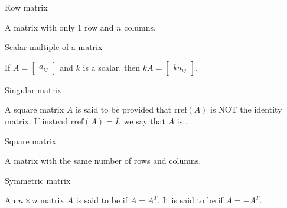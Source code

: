 \documentclass{ximera}
\begin{document}
Row matrix
\begin{expandable}
    A matrix with only $1$ row and $n$ columns.
\end{expandable}


Scalar multiple of a matrix
\begin{expandable}
    If $A=\begin{bmatrix} a_{ij}\end{bmatrix} $ and $k$ is a scalar,
then $kA=\begin{bmatrix} ka_{ij}\end{bmatrix}$. 
\end{expandable}



Singular matrix
\begin{expandable}
    A square matrix $A$ is said to be  provided that $\mbox{rref}(A)$ is NOT the identity matrix.  If instead $\mbox{rref}(A)=I$, we say that $A$ is .
\end{expandable}


Square matrix
\begin{expandable}
    A matrix with the same number of rows and columns.
\end{expandable}


Symmetric matrix
\begin{expandable}
    An $n\times n$ matrix $A$ is said to be
 if $A=A^{T}.$ It is said to be
 if $A=-A^{T}.$
\end{expandable}

 
\end{document}
